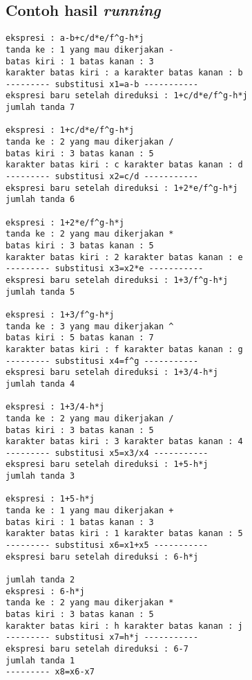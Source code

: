 \documentclass[a4paper,10pt,makeidx]{article}
\begin{document}
\subsection{Contoh hasil {\itshape running}}
\begin{verbatim}
ekspresi : a-b+c/d*e/f^g-h*j
tanda ke : 1 yang mau dikerjakan -
batas kiri : 1 batas kanan : 3
karakter batas kiri : a karakter batas kanan : b
--------- substitusi x1=a-b -----------
ekspresi baru setelah direduksi : 1+c/d*e/f^g-h*j
jumlah tanda 7

ekspresi : 1+c/d*e/f^g-h*j
tanda ke : 2 yang mau dikerjakan /
batas kiri : 3 batas kanan : 5
karakter batas kiri : c karakter batas kanan : d
--------- substitusi x2=c/d -----------
ekspresi baru setelah direduksi : 1+2*e/f^g-h*j
jumlah tanda 6

ekspresi : 1+2*e/f^g-h*j
tanda ke : 2 yang mau dikerjakan *
batas kiri : 3 batas kanan : 5
karakter batas kiri : 2 karakter batas kanan : e
--------- substitusi x3=x2*e -----------
ekspresi baru setelah direduksi : 1+3/f^g-h*j
jumlah tanda 5

ekspresi : 1+3/f^g-h*j
tanda ke : 3 yang mau dikerjakan ^
batas kiri : 5 batas kanan : 7
karakter batas kiri : f karakter batas kanan : g
--------- substitusi x4=f^g -----------
ekspresi baru setelah direduksi : 1+3/4-h*j
jumlah tanda 4

ekspresi : 1+3/4-h*j
tanda ke : 2 yang mau dikerjakan /
batas kiri : 3 batas kanan : 5
karakter batas kiri : 3 karakter batas kanan : 4
--------- substitusi x5=x3/x4 -----------
ekspresi baru setelah direduksi : 1+5-h*j
jumlah tanda 3

ekspresi : 1+5-h*j
tanda ke : 1 yang mau dikerjakan +
batas kiri : 1 batas kanan : 3
karakter batas kiri : 1 karakter batas kanan : 5
--------- substitusi x6=x1+x5 -----------
ekspresi baru setelah direduksi : 6-h*j

jumlah tanda 2
ekspresi : 6-h*j
tanda ke : 2 yang mau dikerjakan *
batas kiri : 3 batas kanan : 5
karakter batas kiri : h karakter batas kanan : j
--------- substitusi x7=h*j -----------
ekspresi baru setelah direduksi : 6-7
jumlah tanda 1
--------- x8=x6-x7
\end{verbatim}
\end{document}
